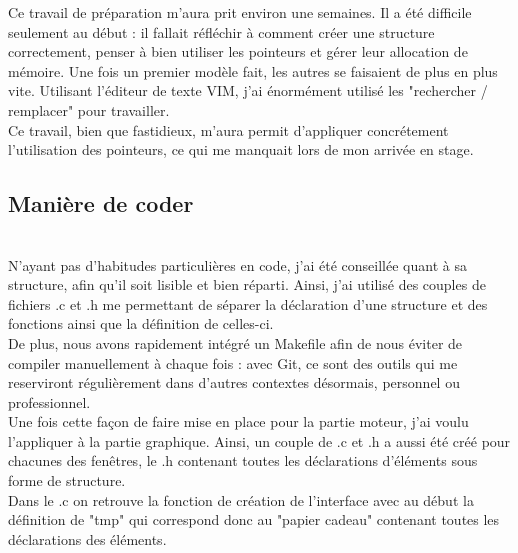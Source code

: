 \documentclass[11pt,french,a4paper]{report}
\begin{document}
Ce travail de préparation m'aura prit environ une semaines. Il a été difficile seulement au début : il fallait réfléchir 
à comment créer une structure correctement, penser à bien utiliser les pointeurs et gérer leur allocation de
mémoire. Une fois un premier modèle fait, les autres se faisaient de plus en plus vite. Utilisant l'éditeur de texte VIM, j'ai 
énormément utilisé les "rechercher / remplacer" pour travailler. \\
Ce travail, bien que fastidieux, m'aura permit d'appliquer concrétement l'utilisation des pointeurs, ce qui 
me manquait lors de mon arrivée en stage. \\ 


        \subsection{Manière de coder}\\
N'ayant pas d'habitudes particulières en code, j'ai été conseillée quant à sa structure, afin qu'il 
soit lisible et bien réparti. Ainsi, j'ai utilisé des couples de fichiers .c et .h me permettant de séparer 
la déclaration d'une structure et des fonctions ainsi que la définition de celles-ci. \\ 

De plus, nous avons rapidement intégré un Makefile afin de nous éviter de compiler manuellement à chaque fois : 
avec Git, ce sont des outils qui me reserviront régulièrement dans d'autres contextes désormais, personnel ou professionnel. \\

Une fois cette façon de faire mise en place pour la partie moteur, j'ai voulu l'appliquer à la partie
graphique. Ainsi, un couple de .c et .h a aussi été créé pour chacunes des fenêtres, le .h contenant 
toutes les déclarations d'éléments sous forme de structure. \\

Dans le .c on retrouve la fonction de création de l'interface avec au début la définition de "tmp" qui correspond donc 
au "papier cadeau" contenant toutes les déclarations des éléments. 
\end{document}
